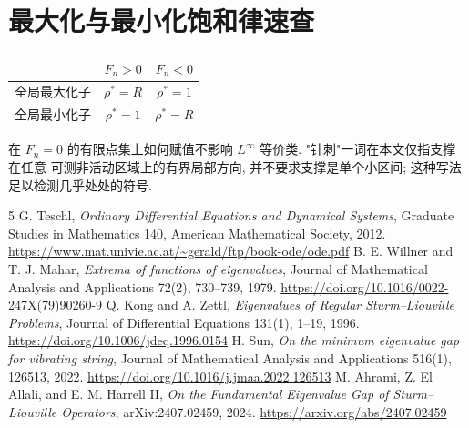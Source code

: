 \documentclass[UTF8]{ctexart}
\begin{document}
\section{最大化与最小化饱和律速查}

\begin{center}
\begin{tabular}{lcc}
\toprule
 & $F_n>0$ & $F_n<0$\\
\midrule
全局最大化子 & $\rho^*=R$ & $\rho^*=1$\\
全局最小化子 & $\rho^*=1$ & $\rho^*=R$\\
\bottomrule
\end{tabular}
\end{center}

在 $F_n=0$ 的有限点集上如何赋值不影响 $L^\infty$ 等价类. "针刺"一词在本文仅指支撑在任意
可测非活动区域上的有界局部方向, 并不要求支撑是单个小区间; 这种写法足以检测几乎处处的符号.

\begin{thebibliography}{5}
 G. Teschl, \emph{Ordinary Differential Equations and Dynamical Systems},
	Graduate Studies in Mathematics 140, American Mathematical Society, 2012.
	\url{https://www.mat.univie.ac.at/~gerald/ftp/book-ode/ode.pdf}
 B. E. Willner and T. J. Mahar, \emph{Extrema of functions of eigenvalues},
	Journal of Mathematical Analysis and Applications 72(2), 730--739, 1979.
	\url{https://doi.org/10.1016/0022-247X(79)90260-9}
 Q. Kong and A. Zettl, \emph{Eigenvalues of Regular Sturm--Liouville Problems},
	Journal of Differential Equations 131(1), 1--19, 1996.
	\url{https://doi.org/10.1006/jdeq.1996.0154}
 H. Sun, \emph{On the minimum eigenvalue gap for vibrating string},
	Journal of Mathematical Analysis and Applications 516(1), 126513, 2022.
	\url{https://doi.org/10.1016/j.jmaa.2022.126513}
 M. Ahrami, Z. El Allali, and E. M. Harrell II, \emph{On the Fundamental
	Eigenvalue Gap of Sturm--Liouville Operators}, arXiv:2407.02459, 2024.
	\url{https://arxiv.org/abs/2407.02459}
\end{thebibliography}
\end{document}
